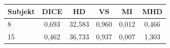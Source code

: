 \begin{tabular}{l c c c c c}
 \hline
Subjekt & DICE & HD & VS & MI & MHD \\ \hline
8 & 0,693 & 32,583 & 0,960 & 0,012 & 0,466 \\
15 & 0,462 & 36,733 & 0,937 & 0,007 & 1,303 \\
\hline 
 \end{tabular}
